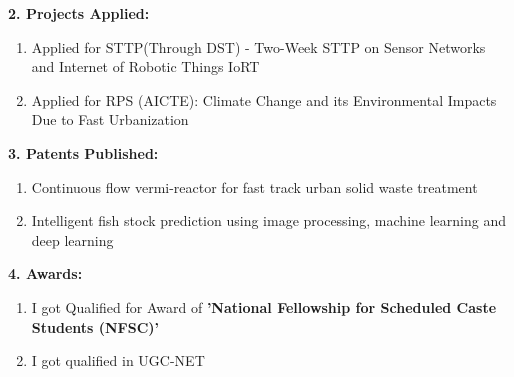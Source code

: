 \documentclass{article}
\begin{document}
\textbf{2. Projects Applied:}
\raggedright
\begin{enumerate}
 \item Applied for STTP(Through DST) - Two-Week STTP on Sensor Networks and Internet of Robotic Things
IoRT
\item Applied for RPS (AICTE): Climate Change and its Environmental Impacts Due to Fast Urbanization
\end{enumerate}

\textbf{3. Patents Published:}
\begin{enumerate}
 \item Continuous flow vermi-reactor for fast track urban solid waste treatment
 \item Intelligent fish stock prediction using image processing, machine learning and deep learning
\end{enumerate}

\textbf{4. Awards:}
\begin{enumerate}
 \item I got Qualified for Award of \textbf{'National Fellowship for Scheduled Caste Students (NFSC)'}
 \item I got qualified in UGC-NET
\end{enumerate}
\end{document}
